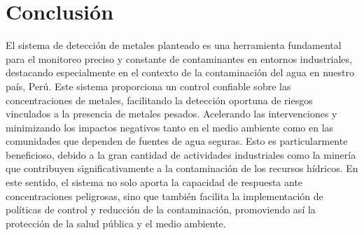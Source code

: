 \section{Conclusión}
El sistema de detección de metales planteado es una herramienta fundamental para el monitoreo preciso y constante de contaminantes en entornos industriales, destacando especialmente en el contexto de la contaminación del agua en nuestro país, Perú. Este sistema proporciona un control confiable sobre las concentraciones de metales, facilitando la detección oportuna de riesgos vinculados a la presencia de metales pesados. Acelerando las intervenciones y minimizando los impactos negativos tanto en el medio ambiente como en las comunidades que dependen de fuentes de agua seguras. Esto es particularmente beneficioso, debido a la gran cantidad de actividades industriales como la minería que contribuyen significativamente a la contaminación de los recursos hídricos. En este sentido, el sistema no solo aporta la capacidad de respuesta ante concentraciones peligrosas, sino que también facilita la implementación de políticas de control y reducción de la contaminación, promoviendo así la protección de la salud pública y el medio ambiente.
